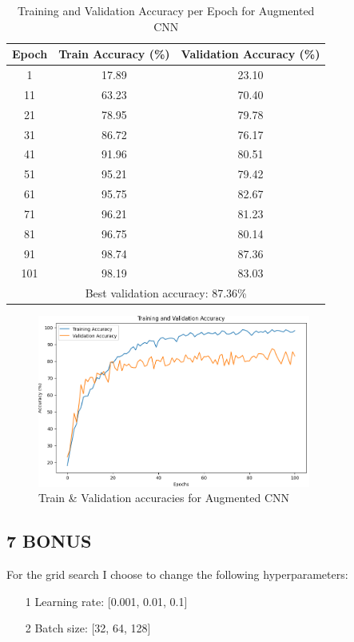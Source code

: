 \documentclass[11pt]{scrartcl}
\begin{document}
\begin{table}[htbp]
\centering
\caption{Training and Validation Accuracy per Epoch for Augmented CNN}
\begin{tabular}{ccc}
\toprule
\textbf{Epoch} & \textbf{Train Accuracy (\%)} & \textbf{Validation Accuracy (\%)} \\
\midrule
1    & 17.89 & 23.10 \\
11   & 63.23 & 70.40 \\
21   & 78.95 & 79.78 \\
31   & 86.72 & 76.17 \\
41   & 91.96 & 80.51 \\
51   & 95.21 & 79.42 \\
61   & 95.75 & 82.67 \\
71   & 96.21 & 81.23 \\
81   & 96.75 & 80.14 \\
91   & 98.74 & 87.36 \\
101  & 98.19 & 83.03 \\
\midrule
\multicolumn{3}{c}{Best validation accuracy: 87.36\%} \\
\bottomrule
\end{tabular}
\label{tab:task2-aug-accuracy}
\end{table}

\begin{figure}[htbp]
\centering
\includegraphics[width=0.8\textwidth]{./figures/task2-aug-accuracy.png}
\caption{Train \& Validation accuracies for Augmented CNN}
\label{fig:task2-aug-accuracy}
\end{figure}


\subsection*{7 BONUS}

For the grid search I choose to change the following hyperparameters:
\begin{itemize}
	\item[1] Learning rate: [0.001, 0.01, 0.1]
	\item[2] Batch size: [32, 64, 128]
\end{itemize}
\end{document}
